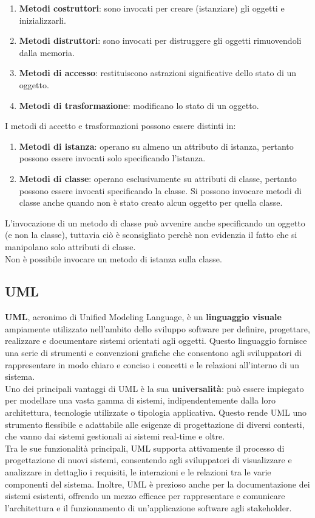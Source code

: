 \documentclass{article}
\begin{document}
	\begin{enumerate}
		\item \textbf{Metodi costruttori}: sono invocati per creare (istanziare) gli oggetti e inizializzarli.
		\item \textbf{Metodi distruttori}: sono invocati per distruggere gli oggetti rimuovendoli dalla memoria.
		\item \textbf{Metodi di accesso}: restituiscono astrazioni significative dello stato di un oggetto.
		\item \textbf{Metodi di trasformazione}: modificano lo stato di un oggetto.
	\end{enumerate}
	I metodi di accetto e trasformazioni possono essere distinti in:
	\begin{enumerate}
		\item \textbf{Metodi di istanza}: operano su almeno un attributo di istanza, pertanto possono essere invocati solo specificando l'istanza.
		\item \textbf{Metodi di classe}: operano esclusivamente su attributi di classe, pertanto possono essere invocati specificando la classe. Si possono invocare metodi di classe anche quando non è stato creato alcun oggetto per quella classe.
	\end{enumerate}
	L'invocazione di un metodo di classe può avvenire anche specificando un oggetto (e non la classe), tuttavia ciò è sconsigliato perchè non evidenzia il fatto che si manipolano solo attributi di classe. \\
	Non è possibile invocare un metodo di istanza sulla classe.

	\subsection{UML}
	\textbf{UML}, acronimo di Unified Modeling Language, è un \textbf{linguaggio visuale} ampiamente utilizzato nell'ambito dello sviluppo software per definire, progettare, realizzare e documentare sistemi orientati agli oggetti. Questo linguaggio fornisce una serie di strumenti e convenzioni grafiche che consentono agli sviluppatori di rappresentare in modo chiaro e conciso i concetti e le relazioni all'interno di un sistema.
	\vspace{\baselineskip} \\
	Uno dei principali vantaggi di UML è la sua \textbf{universalità}: può essere impiegato per modellare una vasta gamma di sistemi, indipendentemente dalla loro architettura, tecnologie utilizzate o tipologia applicativa. Questo rende UML uno strumento flessibile e adattabile alle esigenze di progettazione di diversi contesti, che vanno dai sistemi gestionali ai sistemi real-time e oltre.
	\vspace{\baselineskip} \\
	Tra le sue funzionalità principali, UML supporta attivamente il processo di progettazione di nuovi sistemi, consentendo agli sviluppatori di visualizzare e analizzare in dettaglio i requisiti, le interazioni e le relazioni tra le varie componenti del sistema. Inoltre, UML è prezioso anche per la documentazione dei sistemi esistenti, offrendo un mezzo efficace per rappresentare e comunicare l'architettura e il funzionamento di un'applicazione software agli stakeholder.
\end{document}
